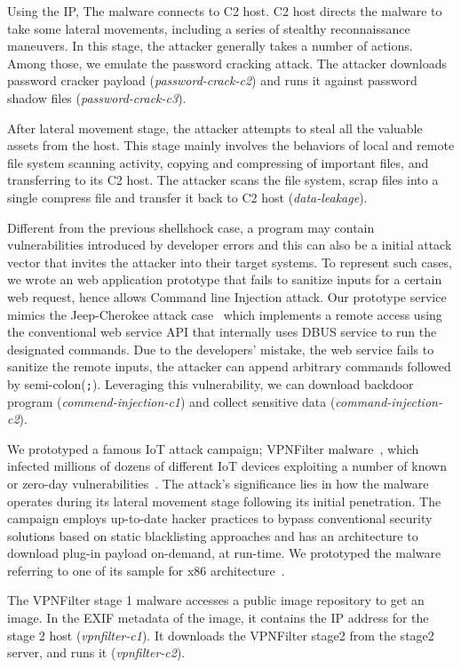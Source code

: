 Using the IP, The malware connects to C2 host. C2 host directs the malware to take
some lateral movements, including a series of stealthy reconnaissance maneuvers. 
In this stage, the attacker generally takes a number of actions. Among those, we emulate the password cracking attack. The attacker downloads password cracker payload (\emph{password-crack-c2}) and runs it against password shadow files (\emph{password-crack-c3}).

After lateral movement stage, the attacker attempts to steal all the valuable assets from the host. 
This stage mainly involves the behaviors of local and remote file system scanning activity, copying and compressing of important files, and transferring to its C2 host.
The attacker scans the file system, scrap files into a single compress file and transfer it back to C2 host (\emph{data-leakage}).

Different from the previous shellshock case, a program may contain vulnerabilities introduced by developer errors and this can also be a initial attack vector that invites the attacker into their target systems. To represent
such cases, we wrote an web application prototype that fails to sanitize inputs for a certain web request, hence allows Command line Injection attack. 
Our prototype service mimics the Jeep-Cherokee attack case~\cite{miller:remote:2015} which implements a remote access using the conventional web service API that
internally uses DBUS service to run the designated commands. 
Due to the developers' mistake, the web service fails to sanitize the remote inputs, the attacker can append arbitrary commands followed by semi-colon({\tt;}). 
Leveraging this vulnerability, we can download backdoor program (\emph{commend-injection-c1}) and collect sensitive data (\emph{command-injection-c2}).

We prototyped a famous IoT attack campaign; VPNFilter malware~\cite{vpnfilterschenier}, which infected millions of dozens of different IoT devices exploiting a number of
known or zero-day vulnerabilities~\cite{vpnfilter1,vpnfilter2}. The attack's
significance lies in how the malware operates during its lateral movement stage following its initial penetration. 
The campaign employs up-to-date hacker practices to bypass conventional security solutions based on static blacklisting approaches and has an architecture to download plug-in payload on-demand, at run-time. 
We prototyped the malware referring to one of its sample for x86 architecture~\cite{vpnfilterx86}. 

The VPNFilter stage 1 malware accesses a public image repository to get an image. In the EXIF metadata of the image, it contains the IP address for the stage 2 host (\emph{vpnfilter-c1}). It downloads the VPNFilter stage2 from the stage2 server, and runs it (\emph{vpnfilter-c2}).


